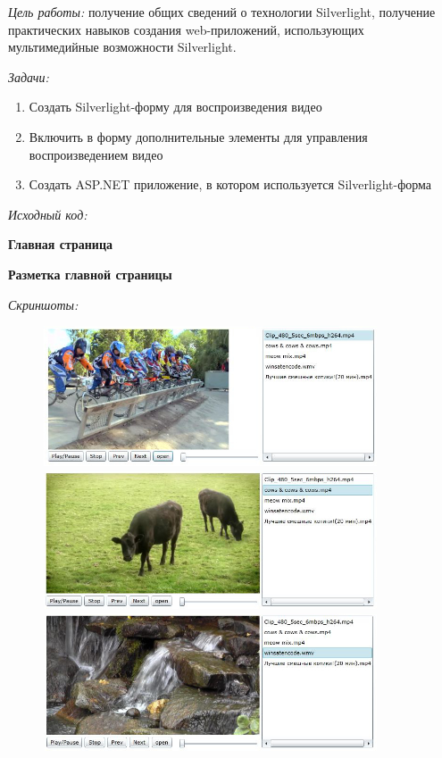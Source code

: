 \documentclass[pscyr, nonums]{hedlab}
\date{}
\begin{document}
    \makeheader
    \emph{Цель работы:} получение общих сведений о технологии Silverlight, получение практических навыков создания web-приложений, использующих 
    мультимедийные возможности Silverlight.

    \emph{Задачи:}
    \begin{enumerate}\itemsep-5pt
        \item Создать Silverlight-форму для воспроизведения видео
        \item Включить в форму дополнительные элементы для управления воспроизведением видео
        \item Создать ASP.NET приложение, в котором используется Silverlight-форма
    \end{enumerate}

    \emph{Исходный код:}
    \begin{center}
        \textbf{Главная страница}
    \end{center}
    

    \begin{center}
        \textbf{Разметка главной страницы}
    \end{center}
    

    \pagebreak

    \emph{Скриншоты:}
    \begin{figure}[ht]
        \center
        \includegraphics[width=0.88\textwidth]{Lab09_01}
        \includegraphics[width=0.88\textwidth]{Lab09_02}
        \includegraphics[width=0.88\textwidth]{Lab09_03}
    \end{figure}
\end{document}
